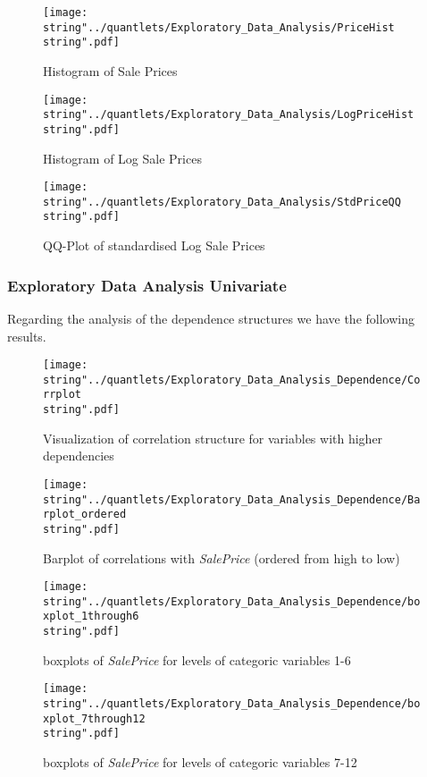 \begin{figure}
  \centering
\texttt{[image: \\string"../quantlets/Exploratory\_Data\_Analysis/PriceHist\\string".pdf]}
  \caption{Histogram of Sale Prices}\label{fig:pricehist}
\end{figure}

\begin{figure}
  \centering
\texttt{[image: \\string"../quantlets/Exploratory\_Data\_Analysis/LogPriceHist\\string".pdf]}
  \caption{Histogram of Log Sale Prices}\label{fig:logpricehist}
\end{figure}

\begin{figure}
  \centering
\texttt{[image: \\string"../quantlets/Exploratory\_Data\_Analysis/StdPriceQQ\\string".pdf]}
  \caption{QQ-Plot of standardised Log Sale Prices}\label{fig:stdpriceqq}
\end{figure}






\subsubsection{Exploratory Data Analysis Univariate}
Regarding the analysis of the dependence structures we have the following results.
\begin{figure}[H]
  \centering
\texttt{[image: \\string"../quantlets/Exploratory\_Data\_Analysis\_Dependence/Corrplot\\string".pdf]}
  \caption{Visualization of correlation structure for variables with higher dependencies}\label{fig:corrgram}
\end{figure}

\begin{figure}[H]
  \centering
\texttt{[image: \\string"../quantlets/Exploratory\_Data\_Analysis\_Dependence/Barplot\_ordered\\string".pdf]}
  \caption{Barplot of correlations with \textit{SalePrice} (ordered from high to low)}\label{fig:barplot_ordered}
\end{figure}

\begin{figure}[H]
\centering
\begin{minipage}{.5\textwidth}
	\centering
	\texttt{[image: \\string"../quantlets/Exploratory\_Data\_Analysis\_Dependence/boxplot\_1through6\\string".pdf]}
  	\caption{boxplots of \textit{SalePrice} for levels of categoric variables 1-6}
  	\label{fig:box1to6}
\end{minipage}%
\begin{minipage}{.5\textwidth}
\centering
	\texttt{[image: \\string"../quantlets/Exploratory\_Data\_Analysis\_Dependence/boxplot\_7through12\\string".pdf]}
  	\caption{boxplots of \textit{SalePrice} for levels of categoric variables 7-12}
  	\label{fig:box7to12}
\end{minipage}
\end{figure}

